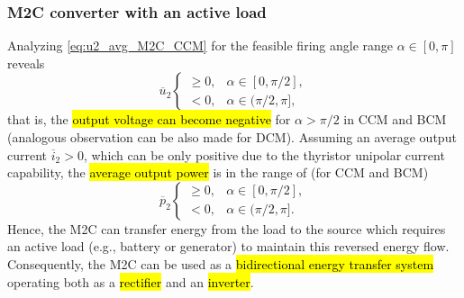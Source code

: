 \begin{frame}[c]
    \frametitle{M2C converter with an active load}
    Analyzing \eqref{eq:u2_avg_M2C_CCM} for the feasible firing angle range $\alpha \in [0,\pi]$ reveals
    \begin{equation}
        \overline{u}_2 \begin{cases}
            \geq 0, & \alpha \in [0,\pi/2],\\
            < 0, & \alpha \in (\pi/2,\pi],
        \end{cases}
    \end{equation}
    that is, the \hl{output voltage can become negative} for $\alpha > \pi/2$ in CCM and BCM (analogous observation can be also made for DCM). Assuming an average output current $\overline{i}_{2} > 0$, which can be only positive due to the thyristor unipolar current capability, the \hl{average output power} is in the range of (for CCM and BCM) 
    \begin{equation}
        \overline{p}_2 \begin{cases}
            \geq 0, & \alpha \in [0,\pi/2],\\
            < 0, & \alpha \in (\pi/2,\pi].
        \end{cases}
    \end{equation}
    Hence, the M2C can transfer energy from the load to the source which requires an active load (e.g., battery or generator) to maintain this reversed energy flow. Consequently, the M2C can be used as a \hl{bidirectional energy transfer system} operating both as a \hl{rectifier} and an \hl{inverter}.
\end{frame}

